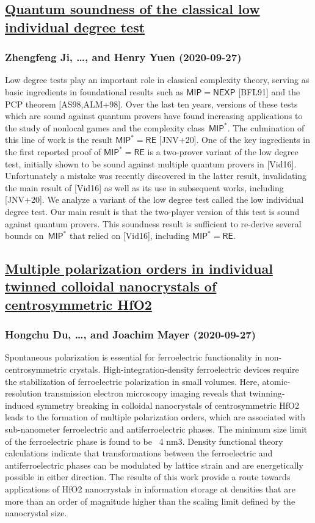 \subsection*{\href{http://arxiv.org/abs/2009.12982v1}{Quantum soundness of the classical low individual degree test}}
\subsubsection*{Zhengfeng Ji, \dots, and Henry Yuen (2020-09-27)}
Low degree tests play an important role in classical complexity theory,
serving as basic ingredients in foundational results such as $\mathsf{MIP} =
\mathsf{NEXP}$ [BFL91] and the PCP theorem [AS98,ALM+98]. Over the last ten
years, versions of these tests which are sound against quantum provers have
found increasing applications to the study of nonlocal games and the complexity
class~$\mathsf{MIP}^*$. The culmination of this line of work is the result
$\mathsf{MIP}^* = \mathsf{RE}$ [JNV+20].
  One of the key ingredients in the first reported proof of $\mathsf{MIP}^* =
\mathsf{RE}$ is a two-prover variant of the low degree test, initially shown to
be sound against multiple quantum provers in [Vid16]. Unfortunately a mistake
was recently discovered in the latter result, invalidating the main result of
[Vid16] as well as its use in subsequent works, including [JNV+20].
  We analyze a variant of the low degree test called the low individual degree
test. Our main result is that the two-player version of this test is sound
against quantum provers. This soundness result is sufficient to re-derive
several bounds on~$\mathsf{MIP}^*$ that relied on [Vid16], including
$\mathsf{MIP}^* = \mathsf{RE}$.

\subsection*{\href{http://arxiv.org/abs/2009.12972v1}{Multiple polarization orders in individual twinned colloidal  nanocrystals of centrosymmetric HfO2}}
\subsubsection*{Hongchu Du, \dots, and Joachim Mayer (2020-09-27)}
Spontaneous polarization is essential for ferroelectric functionality in
non-centrosymmetric crystals. High-integration-density ferroelectric devices
require the stabilization of ferroelectric polarization in small volumes. Here,
atomic-resolution transmission electron microscopy imaging reveals that
twinning-induced symmetry breaking in colloidal nanocrystals of centrosymmetric
HfO2 leads to the formation of multiple polarization orders, which are
associated with sub-nanometer ferroelectric and antiferroelectric phases. The
minimum size limit of the ferroelectric phase is found to be ~4 nm3. Density
functional theory calculations indicate that transformations between the
ferroelectric and antiferroelectric phases can be modulated by lattice strain
and are energetically possible in either direction. The results of this work
provide a route towards applications of HfO2 nanocrystals in information
storage at densities that are more than an order of magnitude higher than the
scaling limit defined by the nanocrystal size.

